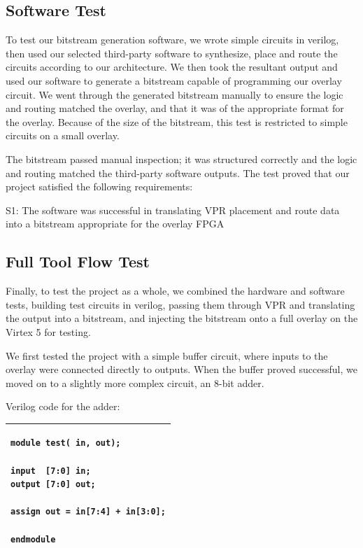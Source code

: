 \subsection{Software Test}

To test our bitstream generation software, we wrote simple circuits in verilog, then used our selected third-party software to synthesize, place and route the circuits according to our architecture.
We then took the resultant output and used our software to generate a bitstream capable of programming our overlay circuit.
We went through the generated bitstream manually to ensure the logic and routing matched the overlay, and that it was of the appropriate format for the overlay.
Because of the size of the bitstream, this test is restricted to simple circuits on a small overlay.

The bitstream passed manual inspection; it was structured correctly and the logic and routing matched the third-party software outputs.
The test proved that our project satisfied the following requirements:
\begin{itemlist}
	\item S1: The software was successful in translating VPR placement and route data into a bitstream appropriate for the overlay FPGA
\end{itemlist}

\subsection{Full Tool Flow Test}

Finally, to test the project as a whole, we combined the hardware and software tests, building test circuits in verilog, passing them through VPR and translating the output into a bitstream, and injecting the bitstream onto a full overlay on the Virtex 5 for testing.

We first tested the project with a simple buffer circuit, where inputs to the overlay were connected directly to outputs.
When the buffer proved successful, we moved on to a slightly more complex circuit, an 8-bit adder.

Verilog code for the adder:

\begin{tabular}{|p{7cm}|}
\hline
\begin{verbatim}
module test( in, out);

input  [7:0] in;
output [7:0] out;

assign out = in[7:4] + in[3:0];

endmodule
\end{verbatim}
\\ \hline
\end{tabular}

